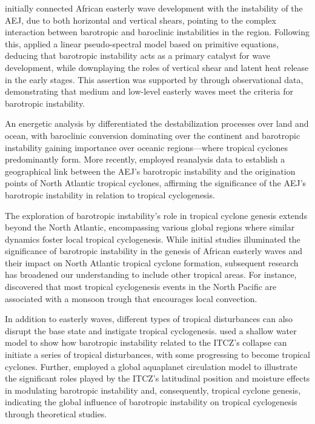 \citet{burpee1972origin} initially connected African easterly wave development with the instability of the AEJ, due to both horizontal and vertical shears, pointing to the complex interaction between barotropic and baroclinic instabilities in the region. Following this, \citet{rennick1976generation} applied a linear pseudo-spectral model based on primitive equations, deducing that barotropic instability acts as a primary catalyst for wave development, while downplaying the roles of vertical shear and latent heat release in the early stages. This assertion was supported by \citet{reed1977structure} through observational data, demonstrating that medium and low-level easterly waves meet the criteria for barotropic instability.

An energetic analysis by \citet{norquist1977energetics} differentiated the destabilization processes over land and ocean, with baroclinic conversion dominating over the continent and barotropic instability gaining importance over oceanic regions—where tropical cyclones predominantly form. More recently, \citet{wu2012african} employed reanalysis data to establish a geographical link between the AEJ's barotropic instability and the origination points of North Atlantic tropical cyclones, affirming the significance of the AEJ's barotropic instability in relation to tropical cyclogenesis.


The exploration of barotropic instability's role in tropical cyclone genesis extends beyond the North Atlantic, encompassing various global regions where similar dynamics foster local tropical cyclogenesis. While initial studies illuminated the significance of barotropic instability in the genesis of African easterly waves and their impact on North Atlantic tropical cyclone formation, subsequent research has broadened our understanding to include other tropical areas. For instance, \citet{zehr1992tropical} discovered that most tropical cyclogenesis events in the North Pacific are associated with a monsoon trough that encourages local convection.

In addition to easterly waves, different types of tropical disturbances can also disrupt the base state and instigate tropical cyclogenesis. \citet{ferreira1997barotropic} used a shallow water model to show how barotropic instability related to the ITCZ's collapse can initiate a series of tropical disturbances, with some progressing to become tropical cyclones. Further, \citet{bembenek2021influence} employed a global aquaplanet circulation model to illustrate the significant roles played by the ITCZ's latitudinal position and moisture effects in modulating barotropic instability and, consequently, tropical cyclone genesis, indicating the global influence of barotropic instability on tropical cyclogenesis through theoretical studies.

